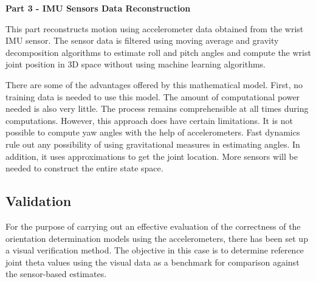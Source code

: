 \documentclass[12pt, a4paper, oneside]{report}
\begin{document}
\begin{enumerate}
\textbf{Part 3 - IMU Sensors Data Reconstruction}

This part reconstructs motion using accelerometer data obtained from the wrist IMU sensor. The sensor data is filtered using moving average and gravity decomposition algorithms to estimate roll and pitch angles and compute the wrist joint position in 3D space without using machine learning algorithms.

There are some of the advantages offered by this mathematical model. First, no training data is needed to use this model. The amount of computational power needed is also very little. The process remains comprehensible at all times during computations. However, this approach does have certain limitations. It is not possible to compute yaw angles with the help of accelerometers. Fast dynamics rule out any possibility of using gravitational measures in estimating angles. In addition, it uses approximations to get the joint location. More sensors will be needed to construct the entire state space.

\end{enumerate}


\subsection{Validation}

For the purpose of carrying out an effective evaluation of the correctness of the orientation determination models using the accelerometers, there has been set up a visual verification method. The objective in this case is to determine reference joint theta values using the visual data as a benchmark for comparison against the sensor-based estimates.
\end{document}

